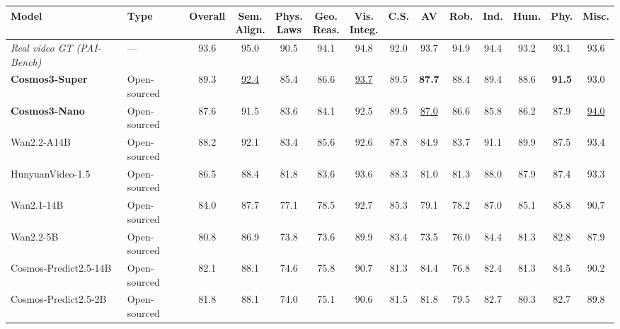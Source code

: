 \documentclass{llmxive}
\providecommand{\arraystretch}{1.5}
\begin{document}
\begin{table}[!htbp]
  \centering
  \footnotesize
  \setlength{\tabcolsep}{3pt}
  \renewcommand{\arraystretch}{1.15}
  \begin{tabular}{l l c cccc | ccccccc}
      \toprule
      \textbf{Model} & \textbf{Type} & \textbf{Overall}
      & \makecell{\textbf{Sem.}\\\textbf{Align.}} & \makecell{\textbf{Phys.}\\\textbf{Laws}} & \makecell{\textbf{Geo.}\\\textbf{Reas.}} & \makecell{\textbf{Vis.}\\\textbf{Integ.}}
      & \textbf{C.S.} & \textbf{AV} & \textbf{Rob.} & \textbf{Ind.} & \textbf{Hum.} & \textbf{Phy.} & \textbf{Misc.} \\
      \midrule
      \rowcolor{black!8}
      \emph{Real video GT (PAI-Bench)} & --- & 93.6 & 95.0 & 90.5 & 94.1 & 94.8 & 92.0 & 93.7 & 94.9 & 94.4 & 93.2 & 93.1 & 93.6 \\
      \midrule
      \rowcolor{rowours}
      \textbf{Cosmos3-Super} & Open-sourced & 89.3 & \underline{92.4} & 85.4 & 86.6 & \underline{93.7} & 89.5 & \textbf{87.7} & 88.4 & 89.4 & 88.6 & \textbf{91.5} & 93.0 \\
      \rowcolor{rowours}
      \textbf{Cosmos3-Nano} & Open-sourced & 87.6 & 91.5 & 83.6 & 84.1 & 92.5 & 89.5 & \underline{87.0} & 86.6 & 85.8 & 86.2 & 87.9 & \underline{94.0} \\
      \midrule
      Wan2.2-A14B & Open-sourced & 88.2 & 92.1 & 83.4 & 85.6 & 92.6 & 87.8 & 84.9 & 83.7 & 91.1 & 89.9 & 87.5 & 93.4 \\
      HunyuanVideo-1.5 & Open-sourced & 86.5 & 88.4 & 81.8 & 83.6 & 93.6 & 88.3 & 81.0 & 81.3 & 88.0 & 87.9 & 87.4 & 93.3 \\
      Wan2.1-14B & Open-sourced & 84.0 & 87.7 & 77.1 & 78.5 & 92.7 & 85.3 & 79.1 & 78.2 & 87.0 & 85.1 & 85.8 & 90.7 \\
      Wan2.2-5B & Open-sourced & 80.8 & 86.9 & 73.8 & 73.6 & 89.9 & 83.4 & 73.5 & 76.0 & 84.4 & 81.3 & 82.8 & 87.9 \\
      Cosmos-Predict2.5-14B & Open-sourced & 82.1 & 88.1 & 74.6 & 75.8 & 90.7 & 81.3 & 84.4 & 76.8 & 82.4 & 81.3 & 84.5 & 90.2 \\
      Cosmos-Predict2.5-2B & Open-sourced & 81.8 & 88.1 & 74.0 & 75.1 & 90.6 & 81.5 & 81.8 & 79.5 & 82.7 & 80.3 & 82.7 & 89.8 \\

\end{tabular}
\end{table}
\end{document}
